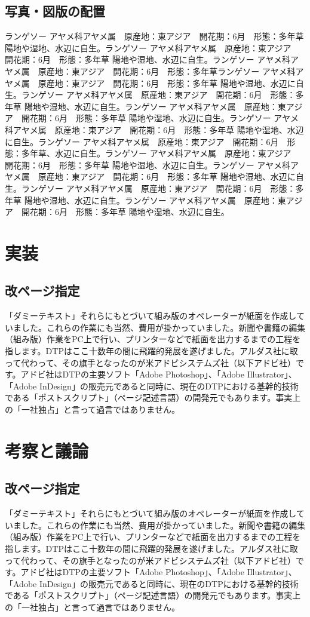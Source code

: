 \documentclass{cuxarticle}
\begin{document}
\section{写真・図版の配置}
ランゲソー
アヤメ科アヤメ属　原産地：東アジア　開花期：6月　形態：多年草
陽地や湿地、水辺に自生。ランゲソー
アヤメ科アヤメ属　原産地：東アジア　開花期：6月　形態：多年草
陽地や湿地、水辺に自生。ランゲソー
アヤメ科アヤメ属　原産地：東アジア　開花期：6月　形態：多年草ランゲソー
アヤメ科アヤメ属　原産地：東アジア　開花期：6月　形態：多年草
陽地や湿地、水辺に自生。ランゲソー
アヤメ科アヤメ属　原産地：東アジア　開花期：6月　形態：多年草
陽地や湿地、水辺に自生。ランゲソー
アヤメ科アヤメ属　原産地：東アジア　開花期：6月　形態：多年草
陽地や湿地、水辺に自生。ランゲソー
アヤメ科アヤメ属　原産地：東アジア　開花期：6月　形態：多年草
陽地や湿地、水辺に自生。ランゲソー
アヤメ科アヤメ属　原産地：東アジア　開花期：6月　形態：多年草、水辺に自生。ランゲソー
アヤメ科アヤメ属　原産地：東アジア　開花期：6月　形態：多年草
陽地や湿地、水辺に自生。ランゲソー
アヤメ科アヤメ属　原産地：東アジア　開花期：6月　形態：多年草
陽地や湿地、水辺に自生。ランゲソー
アヤメ科アヤメ属　原産地：東アジア　開花期：6月　形態：多年草
陽地や湿地、水辺に自生。ランゲソー
アヤメ科アヤメ属　原産地：東アジア　開花期：6月　形態：多年草
陽地や湿地、水辺に自生。

\chapter{実装}
\section{改ページ指定}
「ダミーテキスト」それらにもとづいて組み版のオペレーターが紙面を作成していました。これらの作業にも当然、費用が掛かっていました。新聞や書籍の編集（組み版）作業をPC上で行い、プリンターなどで紙面を出力するまでの工程を指します。DTPはここ十数年の間に飛躍的発展を遂げました。アルダス社に取って代わって、その旗手となったのが米アドビシステムズ社（以下アドビ社）です。アドビ社はDTPの主要ソフト「Adobe Photoshop」、「Adobe Illustrator」、「Adobe InDesign」の販売元であると同時に、現在のDTPにおける基幹的技術である「ポストスクリプト」（ページ記述言語）の開発元でもあります。事実上の「一社独占」と言って過言ではありません。

\chapter{考察と議論}
\section{改ページ指定}
「ダミーテキスト」それらにもとづいて組み版のオペレーターが紙面を作成していました。これらの作業にも当然、費用が掛かっていました。新聞や書籍の編集（組み版）作業をPC上で行い、プリンターなどで紙面を出力するまでの工程を指します。DTPはここ十数年の間に飛躍的発展を遂げました。アルダス社に取って代わって、その旗手となったのが米アドビシステムズ社（以下アドビ社）です。アドビ社はDTPの主要ソフト「Adobe Photoshop」、「Adobe Illustrator」、「Adobe InDesign」の販売元であると同時に、現在のDTPにおける基幹的技術である「ポストスクリプト」（ページ記述言語）の開発元でもあります。事実上の「一社独占」と言って過言ではありません。
\end{document}
